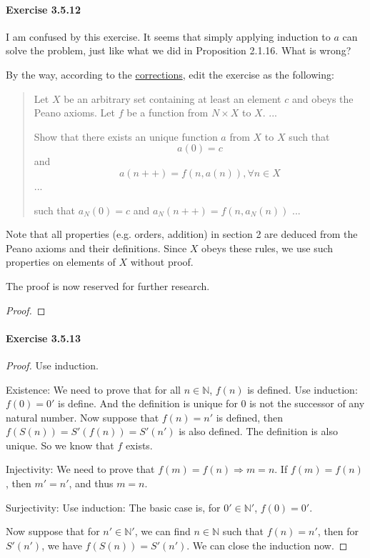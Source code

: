 \paragraph{Exercise 3.5.12} \label{exercise3.5.12}
I am confused by this exercise. It seems that simply applying induction to $a$ can solve the 
problem, just like what we did in Proposition 2.1.16. What is wrong?

By the way, according to the \href{https://terrytao.wordpress.com/books/analysis-i/}{corrections}, 
edit the exercise as the following:
\begin{quotation}
Let $X$ be an arbitrary set containing at least an element $c$ and obeys the Peano axioms. Let $f$ be a 
function from $N \times X$ to $X$. ... 

Show that there exists an unique function $a$ from $X$ to $X$ such that 
\[
a(0) = c
\] 
and 
\[
a(n++) = f(n,a(n)), \forall n \in X
\]
...

such that $a_N(0) = c$ and $a_{N}(n++) = f(n,a_N(n))$ ... 
\end{quotation}

Note that all properties (e.g. orders, addition) in section 2 are deduced from the Peano axioms and their 
definitions. Since $X$ obeys these rules, we use such properties on elements of $X$ without proof.

The proof is now reserved for further research.
\begin{proof}
\end{proof}

\paragraph{Exercise 3.5.13} \label{exercise3.5.13}
\begin{proof}
Use induction.

Existence: We need to prove that for all $n \in \mathbb{N}$, $f(n)$ is defined. Use induction:
$f(0) = 0'$ is define. And the definition is unique for $0$ is not the successor of any natural number. 
Now suppose that $f(n) = n'$ is defined, then $f(S(n)) = S'(f(n)) = S'(n')$ is also defined. The 
definition is also unique. So we know that $f$ exists.

Injectivity: We need to prove that $f(m) = f(n) \Longrightarrow m = n$. If $f(m) = f(n)$, then $m' = n'$, 
and thus $m=n$. 

Surjectivity: Use induction: 
The basic case is, for $0' \in \mathbb{N}'$, $f(0) = 0'$. 

Now suppose that for $n' \in \mathbb{N}'$, we can find $n \in \mathbb{N}$ such that $f(n) = n'$, then 
for $S'(n')$, we have $f(S(n)) = S'(n')$. We can close the induction now.
\end{proof}

